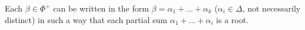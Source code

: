 Each $\beta \in \Phi^+$ can be written in the form $\beta = \alpha_1 + \ldots + \alpha_k$ ($\alpha_i \in \Delta$, not necessarily distinct) in such a way that each partial sum $\alpha_1 + \ldots + \alpha_i$ is a root.
